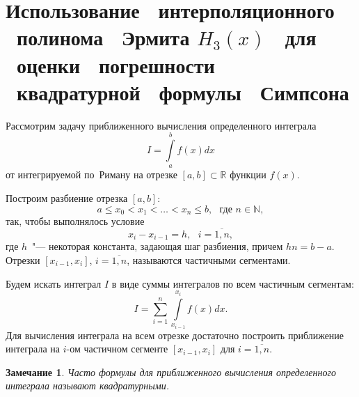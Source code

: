 \documentclass[11pt,a4paper,twoside]{report}
\numberwithin{equation}{section}
\theoremstyle{definition}
\theoremstyle{plain}
\newtheorem*{note*}{Замечание}
\begin{document}
\section[Оценка погрешности формулы Симпсона при помощи полинома Эрмита]
{Использование ~интерполяционного ~полинома ~Эрмита $H_3(x)$
~для ~оценки ~погрешности ~квадратурной ~формулы ~Симпсона}
%
Рассмотрим задачу приближенного вычисления определенного интеграла
%
\begin{equation}
%
    \label{Integr}
    I = \int\limits_{a}^{b}{f(x)dx}
%
\end{equation}
%
от интегрируемой по~Риману на отрезке $[a,b]\subset\mathbb{R}$ функции $f(x)$.

Построим разбиение отрезка $[a,b]$:
%
$$
    a \leqslant x_0 < x_1 < \ldots < x_n \leqslant b,
    ~~~\mbox{где $n\in\mathbb{N}$},
$$
%
так, чтобы выполнялось условие
%
$$
    x_i-x_{i-1} = h, ~~~i=\overline{1,n},
$$
%
где $h$~"--- некоторая константа, задающая шаг разбиения, причем $hn = b-a$.
Отрезки $[x_{i-1},x_i]$, $i=\overline{1,n}$, называются частичными сегментами.

Будем искать интеграл $I$ в виде суммы интегралов по всем частичным сегментам:
%
\begin{equation}
%
    \label{Integr_sum}
    I = \sum_{i=1}^{n} \int\limits_{x_{i-1}}^{x_i}{f(x)dx}.
\end{equation}
%
Для вычисления интеграла на всем отрезке достаточно построить приближение
интеграла на $i$-ом частичном сегменте $[x_{i-1},x_i]$ для
$i=\overline{1,n}$.
%
\begin{note*}
%
     Часто формулы для приближенного вычисления определенного интеграла
     называют квадратурными.
%
\end{note*}
%
\end{document}
